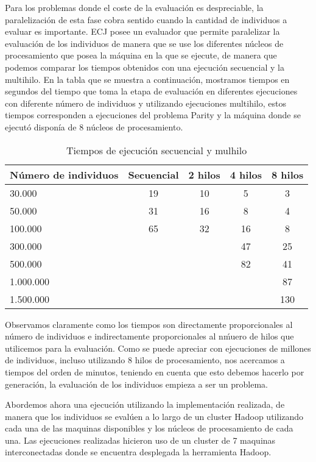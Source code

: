 \label{resultados-parity}

Para los problemas donde el coste de la evaluación es despreciable, la paralelizaci\'on de esta fase cobra sentido cuando la cantidad de individuos a evaluar es importante. ECJ posee un evaluador que permite paralelizar la evaluación de los individuos de manera que se use los diferentes núcleos de procesamiento que posea la m\'aquina en la que se ejecute, de manera que podemos comparar los tiempos obtenidos con una ejecución secuencial y la multihilo. En la tabla que se muestra a continuación, mostramos tiempos en segundos del tiempo que toma la etapa de evaluación en diferentes ejecuciones con diferente n\'umero de individuos y utilizando ejecuciones multihilo, estos tiempos corresponden a ejecuciones del problema Parity y la m\'aquina donde se ejecut\'o disponía de 8 núcleos de procesamiento.

\begin{table}[H]
  \begin{center}
    \begin{center}
    \begin{tabular}{l | c c c c}
    N\'umero de individuos & Secuencial & 2 hilos & 4 hilos & 8 hilos \\ \hline
    30.000 & 19 & 10 & 5 & 3\\
    50.000 & 31 & 16 & 8 & 4\\
    100.000 & 65 & 32 & 16 & 8\\
    300.000 & & & 47 & 25\\
    500.000 & & & 82 & 41\\
    1.000.000 & & & & 87\\
    1.500.000 & & & & 130\\
    \end{tabular}
    \end{center}
    \caption{Tiempos de ejecución secuencial y mulhilo}
    \label{tabla_tiempos_ecj}
  \end{center}
\end{table}

Observamos claramente como los tiempos son directamente proporcionales al n\'umero de individuos e indirectamente proporcionales al n\'muero de hilos que utilicemos para la evaluación. Como se puede apreciar con ejecuciones de millones de individuos, incluso utilizando 8 hilos de procesamiento, nos acercamos a tiempos del orden de minutos, teniendo en cuenta que esto debemos hacerlo por generación, la evaluación de los individuos empieza a ser un problema. 

Abordemos ahora una ejecución utilizando la implementación realizada, de manera que los individuos se evalúen a lo largo de un cluster Hadoop utilizando cada una de las maquinas disponibles y los núcleos de procesamiento de cada una. Las ejecuciones realizadas hicieron uso de un cluster de 7 maquinas interconectadas donde se encuentra desplegada la herramienta Hadoop.